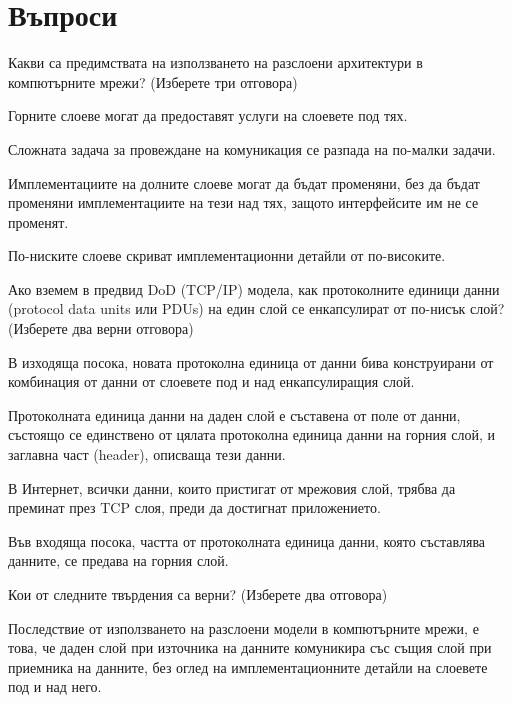 \section*{Въпроси}

\begin{questions}

  \question[6] Какви са предимствата на използването на разслоени архитектури в
  компютърните мрежи? (Изберете три отговора)

  \begin{choices}
    \choice Горните слоеве могат да предоставят услуги на слоевете под тях.

    \CorrectChoice Сложната задача за провеждане на комуникация се разпада на
    по-малки задачи.

    \CorrectChoice Имплементациите на долните слоеве могат да бъдат променяни, без
    да бъдат променяни имплементациите на тези над тях, защото интерфейсите им не
    се променят.

    \CorrectChoice По-ниските слоеве скриват имплементационни детайли от
    по-високите.
  \end{choices}

  \question[6] Ако вземем в предвид \foreignlanguage{english}{DoD (TCP/IP)}
  модела, как протоколните единици данни (\foreignlanguage{english}{protocol
    data units} или \foreignlanguage{english}{PDUs}) на един слой се
  енкапсулират от по-нисък слой? (Изберете два верни отговора)

  \begin{choices}
    \choice В изходяща посока, новата протоколна единица от данни бива
    конструирани от комбинация от данни от слоевете под и над енкапсулиращия слой.

    \CorrectChoice Протоколната единица данни на даден слой е съставена от поле от
    данни, състоящо се единствено от цялата протоколна единица данни на горния
    слой, и заглавна част (\foreignlanguage{english}{header}), описваща тези
    данни.

    \choice В Интернет, всички данни, които пристигат от мрежовия слой, трябва да
    преминат през TCP слоя, преди да достигнат приложението.

    \CorrectChoice Във входяща посока, частта от протоколната единица данни, която
    съставлява данните, се предава на горния слой.
  \end{choices}

  \question[6] Кои от следните твърдения са верни? (Изберете два отговора)
  \begin{choices}
    \CorrectChoice Последствие от използването на разслоени модели в компютърните
    мрежи, е това, че даден слой при източника на данните комуникира със същия
    слой при приемника на данните, без оглед на имплементационните детайли на
    слоевете под и над него.


\end{choices}
\end{questions}
